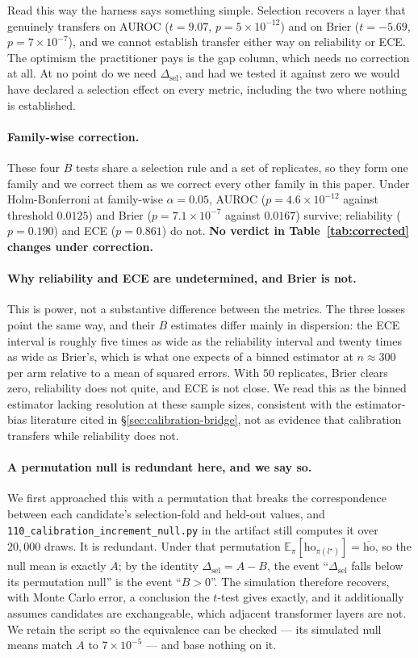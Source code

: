 \documentclass{article}
\begin{document}
Read this way the harness says something simple. Selection recovers a layer
that genuinely transfers on AUROC ($t=9.07$, $p=5\times10^{-12}$) and on Brier
($t=-5.69$, $p=7\times10^{-7}$), and we cannot establish transfer either way
on reliability or ECE. The optimism the practitioner pays is the gap column,
which needs no correction at all. At no point do we need
$\Delta_{\text{sel}}$, and had we tested it against zero we would have
declared a selection effect on every metric, including the two where nothing
is established.

\paragraph{Family-wise correction.} These four $B$ tests share a selection
rule and a set of replicates, so they form one family and we correct them as
we correct every other family in this paper. Under Holm-Bonferroni at
family-wise $\alpha=0.05$, AUROC ($p=4.6\times10^{-12}$ against threshold
$0.0125$) and Brier ($p=7.1\times10^{-7}$ against $0.0167$) survive;
reliability ($p=0.190$) and ECE ($p=0.861$) do not. \textbf{No verdict in
Table~\ref{tab:corrected} changes under correction.}

\paragraph{Why reliability and ECE are undetermined, and Brier is not.} This
is power, not a substantive difference between the metrics. The three losses
point the same way, and their $B$ estimates differ mainly in dispersion: the
ECE interval is roughly five times as wide as the reliability interval and
twenty times as wide as Brier's, which is what one expects of a binned
estimator at $n\!\approx\!300$ per arm relative to a mean of squared errors.
With $50$ replicates, Brier clears zero, reliability does not quite, and ECE
is not close. We read this as the binned estimator lacking resolution at these
sample sizes, consistent with the estimator-bias literature cited in
\S\ref{sec:calibration-bridge}, not as evidence that calibration transfers
while reliability does not.

\paragraph{A permutation null is redundant here, and we say so.} We first
approached this with a permutation that breaks the correspondence between each
candidate's selection-fold and held-out values, and
\texttt{110\_calibration\_increment\_null.py} in the artifact still computes
it over $20{,}000$ draws. It is redundant. Under that permutation
$\mathbb{E}_\pi[\text{ho}_{\pi(l^\star)}]=\overline{\text{ho}}$, so the null
mean is exactly $A$; by the identity $\Delta_{\text{sel}}=A-B$, the event
``$\Delta_{\text{sel}}$ falls below its permutation null'' is the event
``$B>0$''. The simulation therefore recovers, with Monte Carlo error, a
conclusion the $t$-test gives exactly, and it additionally assumes candidates
are exchangeable, which adjacent transformer layers are not. We retain the
script so the equivalence can be checked --- its simulated null means match
$A$ to $7\times10^{-5}$ --- and base nothing on it.
\end{document}
